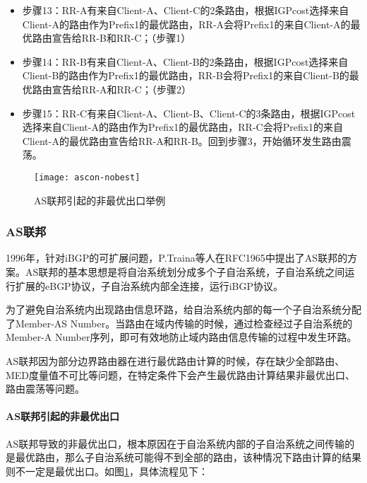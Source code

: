 \begin{itemize}
\item 步骤13：RR-A有来自Client-A、Client-C的2条路由，根据IGPcost选择来自Client-A的路由作为Prefix1的最优路由，RR-A会将Prefix1的来自Client-A的最优路由宣告给RR-B和RR-C；（步骤1）
\item 步骤14：RR-B有来自Client-A、Client-B的2条路由，根据IGPcost选择来自Client-B的路由作为Prefix1的最优路由，RR-B会将Prefix1的来自Client-B的最优路由宣告给RR-A和RR-C；（步骤2）
\item 步骤15：RR-C有来自Client-A、Client-B、Client-C的3条路由，根据IGPcost选择来自Client-A的路由作为Prefix1的最优路由，RR-C会将Prefix1的来自Client-A的最优路由宣告给RR-A和RR-B。回到步骤3，开始循环发生路由震荡。

\end{itemize}

\begin{figure}
  \centering
  \texttt{[image: ascon-nobest]}
  \caption{AS联邦引起的非最优出口举例\cite{rfc5065}}
  \label{fig:ascon-nobest}
\end{figure}


\subsubsection{AS联邦\cite{rfc1965}}


1996年，针对iBGP的可扩展问题，P.Traina等人在RFC1965\cite{rfc1965}中提出了AS联邦的方案。AS联邦的基本思想是将自治系统划分成多个子自治系统，子自治系统之间运行扩展的eBGP协议，子自治系统内部全连接，运行iBGP协议。

为了避免自治系统内出现路由信息环路，给自治系统内部的每一个子自治系统分配了Member-AS Number。当路由在域内传输的时候，通过检查经过子自治系统的Member-A Number序列，即可有效地防止域内路由信息传输的过程中发生环路。






AS联邦因为部分边界路由器在进行最优路由计算的时候，存在缺少全部路由、MED度量值不可比等问题，在特定条件下会产生最优路由计算结果非最优出口、路由震荡等问题。

\paragraph{AS联邦引起的非最优出口}

AS联邦导致的非最优出口\cite{rfc5065}，根本原因在于自治系统内部的子自治系统之间传输的是最优路由，那么子自治系统可能得不到全部的路由，该种情况下路由计算的结果则不一定是最优出口。如图\ref{fig:ascon-nobest}，具体流程见下：

